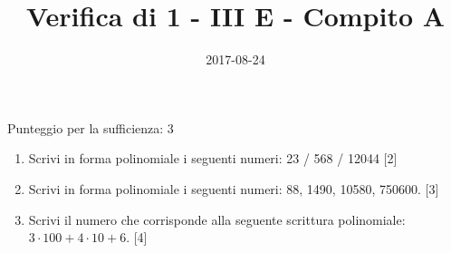 \documentclass[11pt,fleqn]{article} %
\title{Verifica di 1 - III E - Compito A}
\date{2017-08-24}
\newcommand{\T}{\cdot}
\begin{document}
\maketitle
Punteggio per la sufficienza: 3
\begin{enumerate}

\item Scrivi in forma polinomiale i seguenti numeri: 23 / 568 / 12044 [2] 
\item Scrivi in forma polinomiale i seguenti numeri: 88, 1490, 10580, 750600. [3] 
\item Scrivi il numero che corrisponde alla seguente scrittura polinomiale: $3\T100 + 4\T10 + 6$. [4] 
\end{enumerate}
\end{document}
